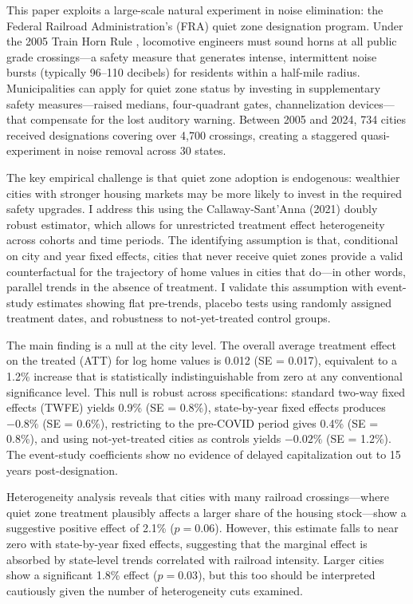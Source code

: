\documentclass[12pt]{article}
\begin{document}
This paper exploits a large-scale natural experiment in noise elimination: the Federal Railroad Administration's (FRA) quiet zone designation program. Under the 2005 Train Horn Rule \citep{fra2005trainhorn}, locomotive engineers must sound horns at all public grade crossings---a safety measure that generates intense, intermittent noise bursts (typically 96--110 decibels) for residents within a half-mile radius. Municipalities can apply for quiet zone status by investing in supplementary safety measures---raised medians, four-quadrant gates, channelization devices---that compensate for the lost auditory warning. Between 2005 and 2024, 734 cities received designations covering over 4,700 crossings, creating a staggered quasi-experiment in noise removal across 30 states.

The key empirical challenge is that quiet zone adoption is endogenous: wealthier cities with stronger housing markets may be more likely to invest in the required safety upgrades. I address this using the Callaway-Sant'Anna (2021) doubly robust estimator, which allows for unrestricted treatment effect heterogeneity across cohorts and time periods. The identifying assumption is that, conditional on city and year fixed effects, cities that never receive quiet zones provide a valid counterfactual for the trajectory of home values in cities that do---in other words, parallel trends in the absence of treatment. I validate this assumption with event-study estimates showing flat pre-trends, placebo tests using randomly assigned treatment dates, and robustness to not-yet-treated control groups.

The main finding is a null at the city level. The overall average treatment effect on the treated (ATT) for log home values is 0.012 (SE = 0.017), equivalent to a 1.2\% increase that is statistically indistinguishable from zero at any conventional significance level. This null is robust across specifications: standard two-way fixed effects (TWFE) yields 0.9\% (SE = 0.8\%), state-by-year fixed effects produces $-0.8\%$ (SE = 0.6\%), restricting to the pre-COVID period gives 0.4\% (SE = 0.8\%), and using not-yet-treated cities as controls yields $-0.02\%$ (SE = 1.2\%). The event-study coefficients show no evidence of delayed capitalization out to 15 years post-designation.

Heterogeneity analysis reveals that cities with many railroad crossings---where quiet zone treatment plausibly affects a larger share of the housing stock---show a suggestive positive effect of 2.1\% ($p = 0.06$). However, this estimate falls to near zero with state-by-year fixed effects, suggesting that the marginal effect is absorbed by state-level trends correlated with railroad intensity. Larger cities show a significant 1.8\% effect ($p = 0.03$), but this too should be interpreted cautiously given the number of heterogeneity cuts examined.
\end{document}
